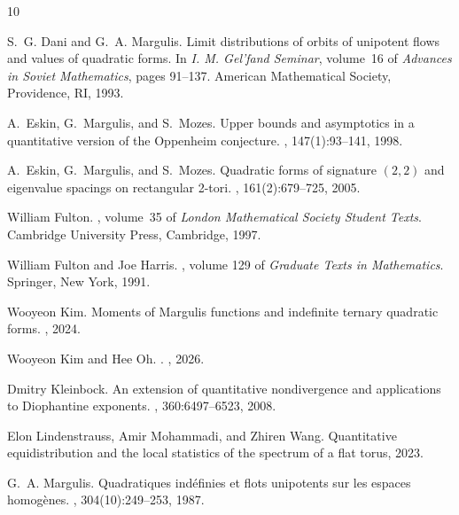 \documentclass[reqno,11pt]{amsart}
\theoremstyle{definition}
\theoremstyle{remark}
\numberwithin{equation}{section}
\begin{document}
\begin{thebibliography}{10}

S.~G. Dani and G.~A. Margulis.
\newblock Limit distributions of orbits of unipotent flows and values of quadratic forms.
\newblock In {\em I. M. Gel'fand Seminar}, volume~16 of {\em Advances in Soviet Mathematics}, pages 91--137. American Mathematical Society, Providence, RI, 1993.

A.~Eskin, G.~Margulis, and S.~Mozes.
\newblock Upper bounds and asymptotics in a quantitative version of the {O}ppenheim conjecture.
, 147(1):93--141, 1998.

A.~Eskin, G.~Margulis, and S.~Mozes.
\newblock Quadratic forms of signature $(2, 2)$ and eigenvalue spacings on rectangular 2-tori.
, 161(2):679--725, 2005.

William Fulton.
, volume~35 of {\em London Mathematical Society Student Texts}.
\newblock Cambridge University Press, Cambridge, 1997.

William Fulton and Joe Harris.
, volume 129 of {\em Graduate Texts in Mathematics}.
\newblock Springer, New York, 1991.

Wooyeon Kim.
\newblock Moments of {M}argulis functions and indefinite ternary quadratic forms.
, 2024.

Wooyeon Kim and Hee Oh.
.
, 2026.

Dmitry Kleinbock.
\newblock An extension of quantitative nondivergence and applications to {D}iophantine exponents.
, 360:6497--6523, 2008.

Elon Lindenstrauss, Amir Mohammadi, and Zhiren Wang.
\newblock Quantitative equidistribution and the local statistics of the spectrum of a flat torus, 2023.

G.~A. Margulis.
\newblock Quadratiques ind{\'e}finies et flots unipotents sur les espaces homog{\`e}nes.
, 304(10):249--253, 1987.


\end{thebibliography}
\end{document}
